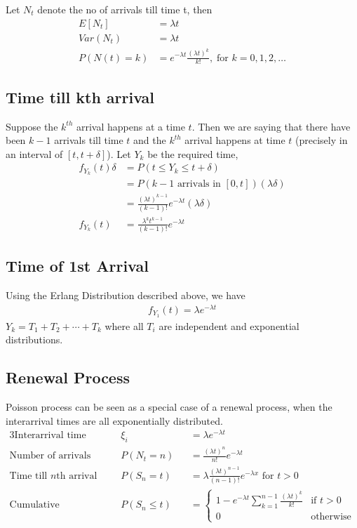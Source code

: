 \documentclass[../../probability-notes.tex]{subfiles}
\begin{document}
    Let $N_{t}$ denote the no of arrivals till time t, then
    \begin{align*}
        E[N_{t}] &= \lambda t\\
        Var(N_{t}) &= \lambda t\\
        P(N(t) = k) &= e^{-\lambda t} \frac{(\lambda t)^{k}}{k!}, \; \text{for $k=0,1,2,\ldots$}
    \end{align*}

    \subsection{Time till kth arrival}
    Suppose the $k^{th}$ arrival happens at a time $t$. Then we are saying that there have been $k-1$ arrivals till time $t$ and the $k^{th}$ arrival happens at time $t$ (precisely in an interval of $[t, t+\delta]$). Let $Y_{k}$ be the required time,
    \begin{align*}
        f_{Y_{k}}(t)\delta &= P(t \leq Y_{k} \leq t+\delta)\\
                    &= P(\text{$k-1$ arrivals  in $[0,t]$}) (\lambda \delta)\\
                    &= \frac{(\lambda t)^{k-1}}{(k-1)!}e^{-\lambda t}(\lambda \delta)\\
        f_{Y_{k}}(t) &= \frac{\lambda^{k} t^{k-1}}{(k-1)!}e^{-\lambda t} \tag*{Erlang Distribution}
    \end{align*}

    \subsection{Time of 1st Arrival}
    Using the Erlang Distribution described above, we have
    \begin{align*}
        f_{Y_{1}}(t) = \lambda e^{-\lambda t}
    \end{align*}
    $Y_{k} = T_{1} + T_{2} + \cdots + T_{k}$ where all $T_{i}$ are independent and exponential distributions.


    \subsection{Renewal Process}
    Poisson process can be seen as a special case of a renewal process, when the interarrival times are all exponentially distributed.
    \begin{alignat*}{3}
        \text{Interarrival time }& \xi_{i}&& = \lambda e^{-\lambda t}\\
        \text{Number of arrivals }& P(N_{t} = n)&& = \frac{(\lambda t)^{n}}{n!} e^{-\lambda t}\\
        \text{Time till $n$th arrival }& P(S_{n} = t)&& = \lambda \frac{(\lambda t)^{n-1}}{(n-1)!} e^{-\lambda x} \text{ for $t > 0$}\\
        \text{Cumulative distribution }& P(S_{n} \leq t)&& = \begin{cases} 1 - e^{-\lambda t} \sum_{k=1}^{n-1} \frac{(\lambda t)^{k}}{k!} &\mbox{if $t > 0$}\\
        0 &\mbox{otherwise} \end{cases}
    \end{alignat*}
\end{document}
